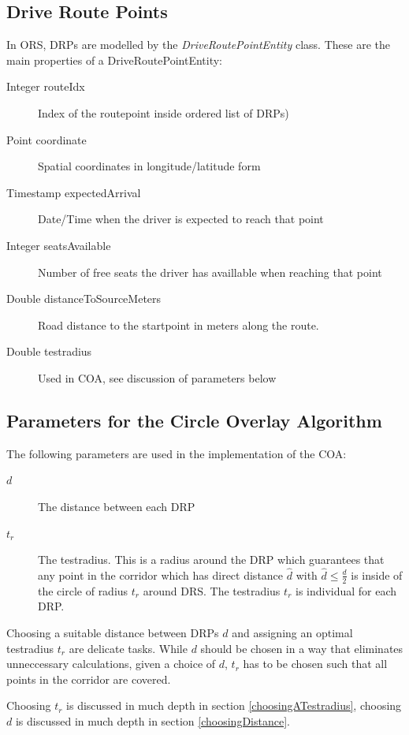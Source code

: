 \subsection{Drive Route Points}

In ORS, DRPs are modelled by the \emph{DriveRoutePointEntity} class.
These are the main properties of a DriveRoutePointEntity:

\begin{description}
     	 \item[Integer routeIdx]{Index of the routepoint inside ordered list of DRPs)} 
	 \item[Point coordinate]{Spatial coordinates in longitude/latitude form} 
  	 \item[Timestamp expectedArrival]{Date/Time when the driver is expected to reach that point}     
    	 \item[Integer seatsAvailable]{Number of free seats the driver has availlable when reaching that point} 
	 \item[Double distanceToSourceMeters]{Road distance to the startpoint in meters along the route.} 
         \item[Double testradius]{Used in COA, see discussion of parameters below}
\end{description}

\subsection{Parameters for the Circle Overlay Algorithm}

The following parameters are used in the implementation of the COA:

\begin{description}
\item[$d$]{The distance between each DRP}
\item[$t_r$]{The testradius. This is a radius around the DRP which guarantees that 
	     any point in the corridor which has direct distance $\hat{d}$ with
	     $\hat{d} \leq \frac{d}{2}$ is inside of the circle of radius $t_r$ around DRS.
	     The testradius $t_r$ is individual for each DRP.}
\end{description}
Choosing a suitable distance between DRPs $d$ and assigning an optimal testradius $t_r$ 
are delicate tasks. While $d$ should be chosen in a way that eliminates unneccessary calculations,
given a choice of $d$, $t_r$ has to be chosen such that all points in the corridor are covered.
\par{
Choosing $t_r$ is discussed in much depth in section \ref{choosingATestradius},
choosing $d$ is discussed in much depth in section \ref{choosingDistance}.
}

